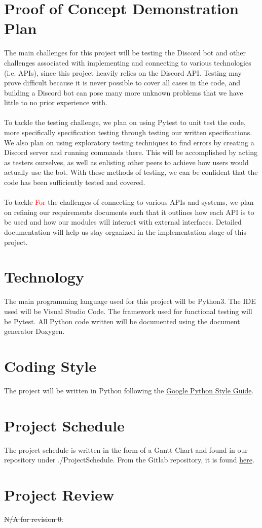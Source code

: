 \documentclass[12pt, titlepage]{article}
\begin{document}
\section{Proof of Concept Demonstration Plan}
The main challenges for this project will be testing the Discord bot and other challenges associated with implementing and connecting to various technologies (i.e. APIs), since this project heavily relies on the Discord API. Testing may prove difficult because it is never possible to cover all cases in the code, and building a Discord bot can pose many more unknown problems that we have little to no prior experience with.\\ \\
To tackle the testing challenge, we plan on using Pytest to unit test the code, more specifically specification testing through testing our written specifications. We also plan on using exploratory testing techniques to find errors by creating a Discord server and running commands there. This will be accomplished by acting as testers ourselves, as well as enlisting other peers to achieve how users would actually use the bot. With these methods of testing, we can be confident that the code has been sufficiently tested and covered.\\ \\
\sout{To tackle} \textcolor{red}{For} the challenges of connecting to various APIs and systems, we plan on refining our requirements documents such that it outlines how each API is to be used and how our modules will interact with external interfaces. Detailed documentation will help us stay organized in the implementation stage of this project.


\section{Technology}
The main programming language used for this project will be Python3. The IDE used will be Visual Studio Code. The framework used for functional testing will be Pytest. All Python code written will be documented using the document generator Doxygen.

\section{Coding Style}
The project will be written in Python following the \href{https://google.github.io/styleguide/pyguide.html}{Google Python Style Guide}.

\section{Project Schedule}
The project schedule is written in the form of a Gantt Chart and found in our repository under ./ProjectSchedule. From the Gitlab repository, it is found \href{https://gitlab.cas.mcmaster.ca/modia1/ScrumBot/tree/master/ProjectSchedule}{here}.

\section{Project Review}
\sout{N/A for revision 0.}
\end{document}
